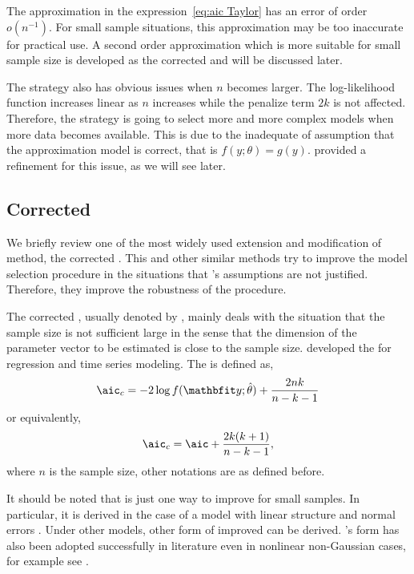 The approximation in the expression~\ref{eq:aic Taylor} has an error of order
$o(n^{-1})$. For small sample situations, this approximation may be too
inaccurate for practical use. A second order approximation which is more
suitable for small sample size is developed as the corrected \aic and will be
discussed later.

The \aic strategy also has obvious issues when $n$ becomes larger. The
log-likelihood function increases linear as $n$ increases while the penalize
term $2k$ is not affected. Therefore, the \aic strategy is going to select
more and more complex models when more data becomes available. This is due to
the inadequate of assumption that the approximation model is correct, that is
$f(y;\theta) = g(y)$. \cite{Takeuchi:1976} provided a refinement for this
issue, as we will see later.

\subsection{Corrected \protect\aic}
\label{sub:Corrected aic}

We briefly review one of the most widely used extension and modification of
\aic method, the corrected \aic. This and other similar methods try to improve
the model selection procedure in the situations that
\cite{Akaike:1973uc}'s assumptions are not justified. Therefore, they
improve the robustness of the \aic procedure.

The corrected \aic, usually denoted by \aicc, mainly deals with the situation
that the sample size is not sufficient large in the sense that the dimension
of the parameter vector to be estimated is close to the sample size.
\cite{Hurvich:1989ev} developed the \aicc for regression and time series
modeling. The \aicc is defined as,
\begin{equation}
  \text{\aicc} = -2\log f(\data;\hat\theta) + \frac{2nk}{n-k-1}
\end{equation}
or equivalently,
\begin{equation}
  \text{\aicc} = \text{\aic} + \frac{2k(k+1)}{n-k-1},
\end{equation}
where $n$ is the sample size, other notations are as defined before.

It should be noted that \aicc is just one way to improve \aic for small
samples. In particular, it is derived in the case of a model with linear
structure and normal errors \cite{Hurvich:1989ev, Burnham:2002wc}. Under other
models, other form of improved \aic can be derived. \cite{Hurvich:1989ev}'s
form has also been adopted successfully in literature even in nonlinear
non-Gaussian cases, for example see \cite{Turkheimer:2003iy}.

